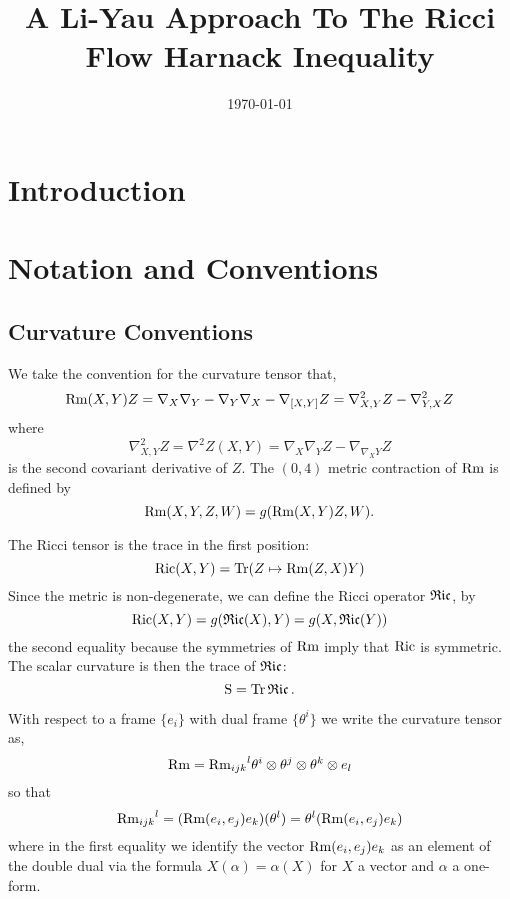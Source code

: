 \documentclass{amsart}
\begin{document}
\title[Harnack For Ricci Flow]
 {A Li-Yau Approach To The Ricci Flow Harnack Inequality}

\curraddr{}
\email{}
\date{\today}

\dedicatory{}
\subjclass[2010]{}
\keywords{}

\begin{abstract}
\end{abstract}

\maketitle

\section{Introduction}
\label{sec:intro}

\section{Notation and Conventions}
\label{sec:conventions}

\subsection{Curvature Conventions}
\label{subsec:conventions_curvature}

We take the convention for the curvature tensor that,
\[
\operatorname{Rm}(X, Y) Z = \nabla_X \nabla_Y - \nabla_ Y \nabla_X - \nabla_{[X, Y]} Z = \nabla^2_{X, Y} Z - \nabla^2_{Y, X} Z
\]
where
\[
\nabla^2_{X, Y} Z = \nabla^2 Z (X, Y) = \nabla_X \nabla_Y Z - \nabla_{\nabla_X Y} Z
\]
is the second covariant derivative of \(Z\). The \((0, 4)\) metric contraction of \(\operatorname{Rm}\) is defined by
\[
\operatorname{Rm}(X, Y, Z, W) = g(\operatorname{Rm}(X, Y)Z, W).
\]

The Ricci tensor is the trace in the first position:
\[
\operatorname{Ric}(X, Y) = \operatorname{Tr} (Z \mapsto \operatorname{Rm}(Z, X)Y)
\]
Since the metric is non-degenerate, we can define the Ricci operator \(\operatorname{\mathfrak{Ric}}\), by
\[
\operatorname{Ric}(X, Y) = g(\operatorname{\mathfrak{Ric}}(X), Y) = g(X, \operatorname{\mathfrak{Ric}}(Y))
\]
the second equality because the symmetries of \(\operatorname{Rm}\) imply that \(\operatorname{Ric}\) is symmetric. The scalar curvature is then the trace of \(\operatorname{\mathfrak{Ric}}\):
\[
\operatorname{S} = \operatorname{Tr} \operatorname{\mathfrak{Ric}}.
\]

With respect to a frame \(\{e_i\}\) with dual frame \(\{\theta^i\}\) we write the curvature tensor as,
\[
\operatorname{Rm} = {\operatorname{Rm}_{ijk}}^l \theta^i \otimes \theta^j \otimes \theta^k \otimes e_l
\]
so that
\[
{\operatorname{Rm}_{ijk}}^l = (\operatorname{Rm}(e_i, e_j) e_k) (\theta^l) = \theta^l (\operatorname{Rm}(e_i, e_j) e_k)
\]
where in the first equality we identify the vector \(\operatorname{Rm}(e_i, e_j)e_k\) as an element of the double dual via the formula \(X(\alpha) = \alpha(X)\) for \(X\) a vector and \(\alpha\) a one-form.
\end{document}
